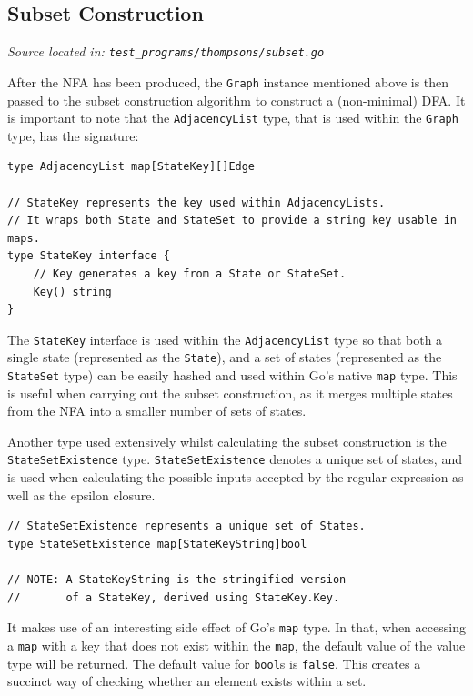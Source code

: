 \documentclass[]{full}
\theoremstyle{definition}
\begin{document}
\subsection{Subset Construction}
\cprotect\textit{Source located in: \verb|test_programs/thompsons/subset.go|}

After the NFA has been produced, the \verb|Graph| instance mentioned above is then passed to the subset construction algorithm to construct a (non-minimal) DFA. It is important to note that the \verb|AdjacencyList| type, that is used within the \verb|Graph| type, has the signature:

\begin{verbatim}
type AdjacencyList map[StateKey][]Edge

// StateKey represents the key used within AdjacencyLists.
// It wraps both State and StateSet to provide a string key usable in maps.
type StateKey interface {
	// Key generates a key from a State or StateSet.
	Key() string
}
\end{verbatim}

The \verb|StateKey| interface is used within the \verb|AdjacencyList| type so that both a single state (represented as the \verb|State|), and a set of states (represented as the \verb|StateSet| type) can be easily hashed and used within Go's native \verb|map| type. This is useful when carrying out the subset construction, as it merges multiple states from the NFA into a smaller number of sets of states.

Another type used extensively whilst calculating the subset construction is the \verb|StateSetExistence| type. \verb|StateSetExistence| denotes a unique set of states, and is used when calculating the possible inputs accepted by the regular expression as well as the epsilon closure.

\begin{verbatim}
// StateSetExistence represents a unique set of States.
type StateSetExistence map[StateKeyString]bool

// NOTE: A StateKeyString is the stringified version 
//       of a StateKey, derived using StateKey.Key.
\end{verbatim}

It makes use of an interesting side effect of Go's \verb|map| type. In that, when accessing a \verb|map| with a key that does not exist within the \verb|map|, the default value of the value type will be returned. The default value for \verb|bool|s is \verb|false|. This creates a succinct way of checking whether an element exists within a set.
\end{document}
